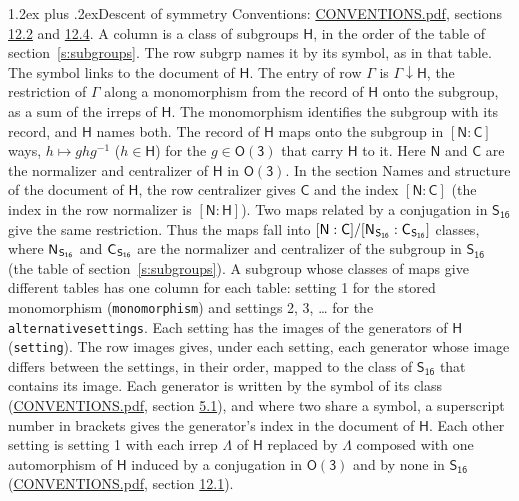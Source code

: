 \documentclass[10pt,a4paper]{article}
\makeatletter
\renewcommand\section{\@startsection{section}{1}{\z@}{-3ex plus -1ex minus -.2ex}%
  {1.2ex plus .2ex}{\normalfont\large\sffamily\bfseries\color{parttitle}}}
\numberwithin{equation}{section}
\newcommand{\grp}[1]{\mathsf{#1}}
\newcommand{\grpindex}[2]{[#1 : #2]}
\newcommand{\restr}[2]{#1\!\downarrow#2}
\newcommand{\hairsp}{\mkern1mu}
\makeatother
\begin{document}
\section{Descent of symmetry}\label{s:subduction}
Conventions: \href{../../CONVENTIONS.pdf}{CONVENTIONS.pdf}, sections \href{../../CONVENTIONS.pdf\#conv.12.2}{12.2} and \href{../../CONVENTIONS.pdf\#conv.12.4}{12.4}.
A column is a class of subgroups $\grp{H}$, in the order of the table of section~\ref{s:subgroups}. The row subgrp names it by its symbol, as in that table. The symbol links to the document of $\grp{H}$. The entry of row $\Gamma$ is $\restr{\Gamma}{\grp{H}}$, the restriction of $\Gamma$ along a monomorphism from the record of $\grp{H}$ onto the subgroup, as a sum of the irreps of $\grp{H}$. The monomorphism identifies the subgroup with its record, and $\grp{H}$ names both. \label{n:group.normalizer.o3}\label{n:group.centralizer.o3}The record of $\grp{H}$ maps onto the subgroup in $\grpindex{\grp{N}}{\grp{C}}$ ways, $h \mapsto g h g^{-1}$ ($h \in \grp{H}$) for the $g \in \grp{O(3)}$ that carry $\grp{H}$ to it. Here $\grp{N}$ and $\grp{C}$ are the normalizer and centralizer of $\grp{H}$ in \href{O3.pdf}{$\grp{O(3)}$}. In the section Names and structure of the document of $\grp{H}$, the row centralizer gives $\grp{C}$ and the index $\grpindex{\grp{N}}{\grp{C}}$ (the index in the row normalizer is $\grpindex{\grp{N}}{\grp{H}}$). Two maps related by a conjugation in $\grp{S_{16}}$ give the same restriction. Thus the maps fall into $\grpindex{\grp{N}}{\grp{C}}/\grpindex{\grp{N}_{\hairsp \grp{S_{16}}}}{\grp{C}_{\hairsp \grp{S_{16}}}}$ classes, where $\grp{N}_{\hairsp \grp{S_{16}}}$ and $\grp{C}_{\hairsp \grp{S_{16}}}$ are the normalizer and centralizer of the subgroup in $\grp{S_{16}}$ (the table of section~\ref{s:subgroups}). \label{n:head.setting}A subgroup whose classes of maps give different tables has one column for each table: setting 1 for the stored monomorphism (\texttt{monomorphism}) and settings 2, 3, \dots{} for the \texttt{alternativesettings}. Each setting has the images of the generators of $\grp{H}$ (\texttt{setting}). \label{n:head.images}The row images gives, under each setting, each generator whose image differs between the settings, in their order, mapped to the class of $\grp{S_{16}}$ that contains its image. Each generator is written by the symbol of its class (\href{../../CONVENTIONS.pdf}{CONVENTIONS.pdf}, section \href{../../CONVENTIONS.pdf\#conv.5.1}{5.1}), and where two share a symbol, a superscript number in brackets gives the generator's index in the document of $\grp{H}$. \label{n:irrep.Delta}Each other setting is setting 1 with each irrep $\Lambda$ of $\grp{H}$ replaced by $\Lambda$ composed with one automorphism of $\grp{H}$ induced by a conjugation in \href{O3.pdf}{$\grp{O(3)}$} and by none in $\grp{S_{16}}$ (\href{../../CONVENTIONS.pdf}{CONVENTIONS.pdf}, section \href{../../CONVENTIONS.pdf\#conv.12.1}{12.1}).
\end{document}
